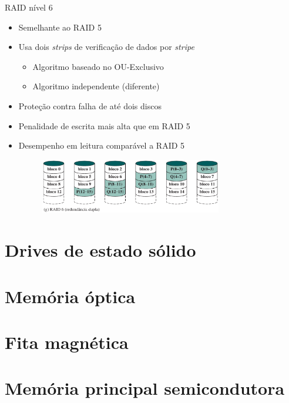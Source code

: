 \begin{slide}{RAID nível 6}
	\begin{itemize}
		\item Semelhante ao RAID 5
		\item Usa dois \emph{strips} de verificação de dados por \emph{stripe}
			\begin{itemize}
				\item Algoritmo baseado no OU-Exclusivo
				\item Algoritmo independente (diferente)
			\end{itemize}
		\item Proteção contra falha de até dois discos
		\item Penalidade de escrita mais alta que em RAID 5
		\item Desempenho em leitura comparável a RAID 5
			\begin{figure}[h]
				\centering
				\includegraphics[width=0.75\textwidth]{figs/raid6}
			\end{figure}
	\end{itemize}
\end{slide}
\section[slide=true]{Drives de estado sólido}
\section[slide=true]{Memória óptica}
\section[slide=true]{Fita magnética}
\section[slide=true]{Memória principal semicondutora}

%
%
%
%

